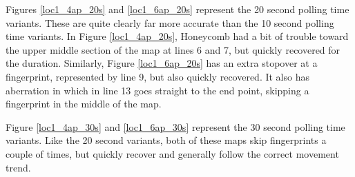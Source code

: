 Figures \ref{loc1_4ap_20s} and \ref{loc1_6ap_20s} represent the 20 second polling time variants. These are quite clearly far more accurate than the 10 second polling time variants. In Figure \ref{loc1_4ap_20s}, Honeycomb had a bit of trouble toward the upper middle section of the map at lines 6 and 7, but quickly recovered for the duration. Similarly, Figure \ref{loc1_6ap_20s} has an extra stopover at a fingerprint, represented by line 9, but also quickly recovered. It also has aberration in which in line 13 goes straight to the end point, skipping a fingerprint in the middle of the map.

Figure \ref{loc1_4ap_30s} and \ref{loc1_6ap_30s} represent the 30 second polling time variants. Like the 20 second variants, both of these maps skip fingerprints a couple of times, but quickly recover and generally follow the correct movement trend. 